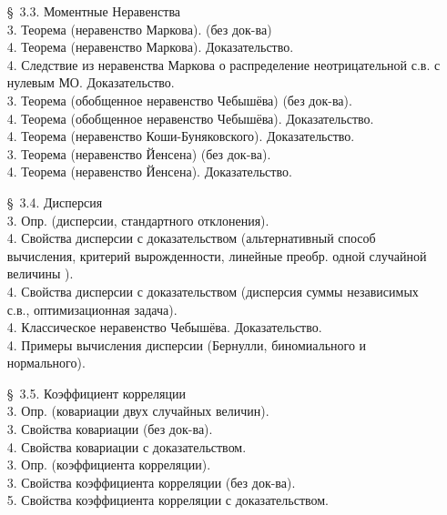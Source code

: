 \documentclass[10pt]{amsart}
\begin{document}
\begin{enumerate}
\begin{enumerate}
\item[\S\, 3.3.] Моментные Неравенства \\
3. Теорема (неравенство Маркова). (без док-ва) \\
4. Теорема (неравенство Маркова). Доказательство. \\
4. Следствие из неравенства Маркова о распределение неотрицательной с.в. с нулевым МО. Доказательство. \\
3. Теорема (обобщенное неравенство Чебышёва) (без док-ва). \\
4. Теорема (обобщенное неравенство Чебышёва). Доказательство. \\
4. Теорема (неравенство Коши-Буняковского). Доказательство. \\
3. Теорема (неравенство Йенсена) (без док-ва). \\
4. Теорема (неравенство Йенсена). Доказательство. \\

\item[\S\, 3.4.] Дисперсия \\
3. Опр. (дисперсии, стандартного отклонения). \\ 
4. Свойства дисперсии с доказательством (альтернативный способ вычисления, критерий вырожденности, линейные преобр. одной случайной величины ). \\ 
4. Свойства дисперсии с доказательством (дисперсия суммы независимых с.в., оптимизационная задача). \\ 
4. Классическое неравенство Чебышёва. Доказательство. \\
4. Примеры вычисления дисперсии (Бернулли, биномиального и нормального). \\
 
        
        
\item[\S\, 3.5.] Коэффициент корреляции \\
3. Опр. (ковариации двух случайных величин). \\
3. Свойства ковариации (без док-ва). \\
4. Свойства ковариации с доказательством. \\
3. Опр. (коэффициента корреляции). \\
3. Свойства коэффициента корреляции (без док-ва). \\
5. Свойства коэффициента корреляции с доказательством. \\



       
        


\end{enumerate}
\end{enumerate}
\end{document}
